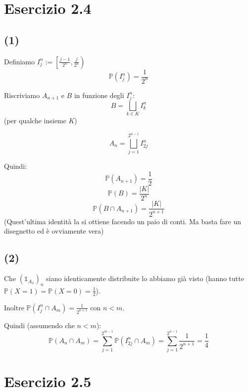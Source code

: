 \documentclass{article}
\begin{document}
\section{Esercizio 2.4}
\subsection{(1)}
Definiamo $I_j^n := \left[\frac{j-1}{2^n}, \frac{j}{2^n}\right)$
\[\mathbb{P}\left(I_j^n\right) = \frac{1}{2^n}\]

Riscriviamo $A_{n+1}$ e $B$ in funzione degli $I_j^n$:
\[
	B = \bigsqcup _{k\in K} I_k^n
\]
(per qualche insieme $K$)

\[
	A_{n} = \bigsqcup _{j=1}^{2^{n-1}} I_{2j}^{n}
\]

Quindi:
\[
	\mathbb{P}(A_{n+1}) = \frac{1}{2}
\]
\[
	\mathbb{P}(B) = \frac{|K|}{2^n}
\]
\[
	\mathbb{P}\left(B \cap  A_{n+1}\right) = \frac{|K|}{2^{n+1}}
\]
(Quest'ultima identità la si ottiene facendo un paio di conti. Ma basta fare un disegnetto ed è ovviamente vera)

\subsection{(2)}

Che $\left(\mathds{1}_{A_n}\right)_n$ siano identicamente distribuite lo abbiamo già visto (hanno tutte $\mathbb{P}(X=1)= \mathbb{P}(X=0) = \frac{1}{2}$).

Inoltre $\mathbb{P}\left(I_j^n \cap A_m\right) = \frac{1}{2^{n+1}}$ con $n<m$.

Quindi (assumendo che $n<m$):
\[
	\mathbb{P}\left(A_n \cap A_m\right) = \sum_{j=1}^{2^{m-1}}\mathbb{P}\left(I_{2j}^n \cap A_m\right) = \sum_{j=1}^{2^{n-1}}\frac{1}{2^{n+1}} = \frac{1}{4}
\]

\begin{comment}

\[
	\mathbb{P}\left(A_n\cap A_{n+l}\right) = \mathbb{P}\left(A_n \cap  \sqcup _{k\leq 2^{n+l-1}} I_{2k}^{n+l}\right) = \mathbb{P}\left(\sqcup _{k\leq 2^{n+l-1}}A_n \cap   I_{2k}^{n+l}\right) = \sum _{k\leq 2^{n+l-1}}\mathbb{P}\left(A_n \cap   I_{2k}^{n+l}\right) = \sum _{k\leq 2^{n+l-1}} \frac{1}{2^{n+l+1}} = {}
\]
\end{comment}

\section{Esercizio 2.5}
\end{document}
